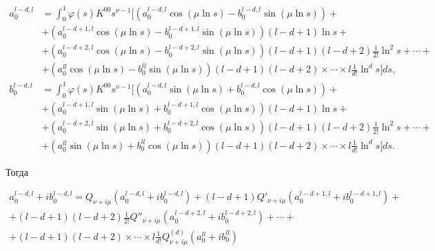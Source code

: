 \begin{equation} 


\begin{split} 


a^{l-d,l}_0&=\int^1_0\varphi(s)K^{00}s^{\nu-1}\bigg[ 


(a^{l-d,l}_0\cos(\mu\ln s)-b^{l-d,l}_0\sin(\mu\ln s))+ \\ 


&+(a^{l-d+1,l}_0\cos(\mu\ln s)-b^{l-d+1,l}_0\sin(\mu\ln s)) 


(l-d+1)\ln s+\\ 


&+(a^{l-d+2,l}_0\cos(\mu\ln s)-b^{l-d+2,l}_0\sin(\mu\ln s)) 


(l-d+1)(l-d+2)\frac{1}{2!}\ln^2s+\dotsb+\\ 


&+(a^{ll}_0\cos(\mu\ln s)-b^{ll}_0\sin(\mu\ln s)) 


(l-d+1)(l-d+2)\times\dotsb\times l\frac{1}{d!} 


\ln^d s\bigg]ds, \\ 


% 


b^{l-d,l}_0&=\int^1_0\varphi(s)K^{00}s^{\nu-1}\bigg[ 


(a^{l-d,l}_0\sin(\mu\ln s)+b^{l-d,l}_0\cos(\mu\ln s))+\\ 


&+(a^{l-d+1,l}_0\sin(\mu\ln s)+b^{l-d+1,l}_0\cos(\mu\ln s)) 


(l-d+1)\ln s+\\ 


&+(a^{l-d+2,l}_0\sin(\mu\ln s)+b^{l-d+2,l}_0\cos(\mu\ln s)) 


(l-d+1)(l-d+2)\frac{1}{2!}\ln^2 s+\dotsb+\\ 


&+(a^{ll}_0\sin(\mu\ln s)+b^{ll}_0\cos(\mu\ln s)) 


(l-d+1)(l-d+2)\times\dotsb\times l\frac{1}{d!} 


\ln^d s\bigg]ds. 


\end{split} 


\end{equation} 


 


Тогда 


\begin{gather*} 


a^{l-d,l}_0+ib^{l-d,l}_0=Q_{\nu+i\mu}(a^{l-d,l}_0+ 


ib^{l-d,l}_0)+(l-d+1)Q'_{\nu+i\mu}(a^{l-d+1,l}_0+ 


ib^{l-d+1,l}_0)+\\ 


+(l-d+1)(l-d+2)\frac{1}{2!}Q''_{\nu+i\mu}(a^{l-d+2,l}_0+ 


ib^{l-d+2,l}_0)+\dotsb+ \\ +(l-d+1)(l-d+2)\times\dotsb\times 


l\frac{1}{d!}Q^{(d)}_{\nu+i\mu}(a^{ll}_0+ib^{ll}_0) 


\end{gather*} 



